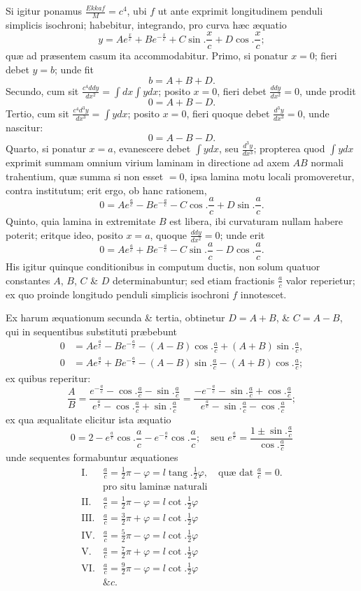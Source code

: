 Si igitur ponamus $\frac{Ekkaf}M=c^4$, ubi $f$ ut ante exprimit longitudinem penduli simplicis isochroni; habebitur, integrando, pro curva hæc æquatio
\[y=Ae^{\frac xc}+Be^{-\frac xc}+C\sin.\frac xc+D\cos.\frac xc;\]
quæ ad præsentem casum ita accommodabitur. Primo, si ponatur $x=0$; fieri debet $y=b$; unde fit
\[b=A+B+D.\]
Secundo, cum sit $\frac{c^4ddy}{dx^2}=\int dx\int ydx$; posito $x=0$, fieri debet $\frac{ddy}{dx^2}=0$, unde prodit
\[0=A+B-D.\]
Tertio, cum sit $\frac{c^4d^3y}{dx^3}=\int ydx$; posito $x=0$, fieri quoque debet $\frac{d^3y}{dx^3}=0$, unde nascitur:
\[0=A-B-D.\]
Quarto, si ponatur $x=a$, evanescere debet $\int ydx$, seu $\frac{d^3y}{dx^3}$; propterea quod $\int ydx$ exprimit summam omnium virium laminam in directione ad axem $AB$ normali trahentium, quæ summa si non esset $=0$, ipsa lamina motu locali promoveretur, contra institutum; erit ergo, ob hanc rationem,
\[0=Ae^{\frac ac}-Be^{-\frac ac}-C\cos.\frac ac+D\sin.\frac ac.\]
Quinto, quia lamina in extremitate $B$ est libera, ibi curvaturam nullam habere poterit; eritque ideo, posito $x=a$, quoque $\frac{ddy}{dx^2}=0$; unde erit
\[0=Ae^{\frac ac}+Be^{-\frac ac}-C\sin.\frac ac-D\cos.\frac ac.\]
His igitur quinque conditionibus in computum ductis, non solum quatuor constantes $A$, $B$, $C$ \& $D$ determinabuntur; sed etiam fractionis $\frac ac$ valor reperietur; ex quo proinde longitudo penduli simplicis isochroni $f$ innotescet.

Ex harum æquationum secunda \& tertia, obtinetur $D=A+B$, \& $C=A-B$, qui in sequentibus substituti præbebunt
\[\begin{aligned}
0&=Ae^{\frac ac}-Be^{-\frac ac}-(A-B)\cos.\frac ac+(A+B)\sin.\frac ac,\\
0&=Ae^{\frac ac}+Be^{-\frac ac}-(A-B)\sin.\frac ac-(A+B)\cos.\frac ac;
\end{aligned}\]
ex quibus reperitur:
\[\frac AB=\frac{e^{-\frac ac}-\cos.\frac ac-\sin.\frac ac}{e^{\frac ac}-\cos.\frac ac+\sin.\frac ac}=\frac{-e^{-\frac ac}-\sin.\frac ac+\cos.\frac ac}{e^{\frac ac}-\sin.\frac ac-\cos.\frac ac};\]
ex qua æqualitate elicitur ista æquatio
\[0=2-e^{\frac ac}\cos.\frac ac-e^{-\frac ac}\cos.\frac ac;\quad\text{seu }e^{\frac ac}=\frac{1\pm\sin.\frac ac}{\cos.\frac ac}\]
unde sequentes formabuntur æquationes
\[\begin{array}{rl}
\mathrm{I}.&\frac ac=\frac12\pi-\varphi=l\operatorname{tang}.\frac12\varphi,\quad\text{quæ dat }\frac ac=0.\\
&\text{pro situ laminæ naturali}\\
\mathrm{II}.&\frac ac=\frac12\pi-\varphi=l\cot.\frac12\varphi\\
\mathrm{III}.&\frac ac=\frac32\pi+\varphi=l\cot.\frac12\varphi\\
\mathrm{IV}.&\frac ac=\frac52\pi-\varphi=l\cot.\frac12\varphi\\
\mathrm{V}.&\frac ac=\frac72\pi+\varphi=l\cot.\frac12\varphi\\
\mathrm{VI}.&\frac ac=\frac92\pi-\varphi=l\cot.\frac12\varphi\\
&\&c.
\end{array}\]

